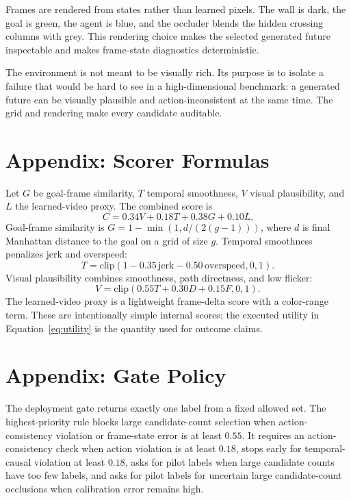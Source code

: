 \documentclass{article}
\begin{document}
Frames are rendered from states rather than learned pixels. The wall is dark, the goal is green, the agent is blue, and the occluder blends the hidden crossing columns with grey. This rendering choice makes the selected generated future inspectable and makes frame-state diagnostics deterministic.

The environment is not meant to be visually rich. Its purpose is to isolate a failure that would be hard to see in a high-dimensional benchmark: a generated future can be visually plausible and action-inconsistent at the same time. The grid and rendering make every candidate auditable.

\section{Appendix: Scorer Formulas}
\label{app:scorers}

Let \(G\) be goal-frame similarity, \(T\) temporal smoothness, \(V\) visual plausibility, and \(L\) the learned-video proxy. The combined score is
\begin{equation}
  C = 0.34V + 0.18T + 0.38G + 0.10L.
\end{equation}
Goal-frame similarity is \(G=1-\min(1,d/(2(g-1)))\), where \(d\) is final Manhattan distance to the goal on a grid of size \(g\). Temporal smoothness penalizes jerk and overspeed:
\begin{equation}
  T = \mathrm{clip}(1 - 0.35\,\mathrm{jerk} - 0.50\,\mathrm{overspeed},0,1).
\end{equation}
Visual plausibility combines smoothness, path directness, and low flicker:
\begin{equation}
  V = \mathrm{clip}(0.55T + 0.30D + 0.15F,0,1).
\end{equation}
The learned-video proxy is a lightweight frame-delta score with a color-range term. These are intentionally simple internal scores; the executed utility in Equation~\ref{eq:utility} is the quantity used for outcome claims.

\section{Appendix: Gate Policy}
\label{app:gate}

The deployment gate returns exactly one label from a fixed allowed set. The highest-priority rule blocks large candidate-count selection when action-consistency violation or frame-state error is at least \(0.55\). It requires an action-consistency check when action violation is at least \(0.18\), stops early for temporal-causal violation at least \(0.18\), asks for pilot labels when large candidate counts have too few labels, and asks for pilot labels for uncertain large candidate-count occlusions when calibration error remains high.
\end{document}
